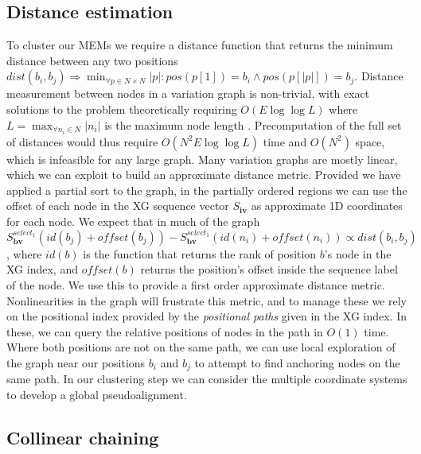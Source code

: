 \subsection{Distance estimation}
To cluster our MEMs we require a distance function that returns the minimum distance between any two positions $dist(b_i, b_j) \Rightarrow \min_{\forall p \in N \times N}{|p|} : pos(p[1]) = b_i \land pos(p[|p|]) = b_j$.
Distance measurement between nodes in a variation graph is non-trivial, with exact solutions to the problem theoretically requiring $O(E \log \log L)$ where $L = \max_{\forall n_i \in N} |n_i|$ is the maximum node length \cite{karlsson1983mlog}.
Precomputation of the full set of distances would thus require $O(N^2 E \log \log L)$ time and $O(N^2)$ space, which is infeasible for any large graph.
Many variation graphs are mostly linear, which we can exploit to build an approximate distance metric.
Provided we have applied a partial sort to the graph, in the partially ordered regions we can use the offset of each node in the XG sequence vector $S_\textbf{iv}$ as approximate 1D coordinates for each node.
We expect that in much of the graph $S_\textbf{bv}^{select_1}(id(b_j)+offset(b_j)) - S_\textbf{bv}^{select_1}(id(n_i)+offset(n_i)) \propto dist(b_i, b_j)$, where $id(b)$ is the function that returns the rank of position $b$'s node in the XG index, and $offset(b)$ returns the position's offset inside the sequence label of the node.
We use this to provide a first order approximate distance metric.
Nonlinearities in the graph will frustrate this metric, and to manage these we rely on the positional index provided by the \emph{positional paths} given in the XG index.
In these, we can query the relative positions of nodes in the path in $O(1)$ time.
Where both positions are not on the same path, we can use local exploration of the graph near our positions $b_i$ and $b_j$ to attempt to find anchoring nodes on the same path.
In our clustering step we can consider the multiple coordinate systems to develop a global pseudoalignment.

\subsection{Collinear chaining}
\label{sec:collinear_chaining}

